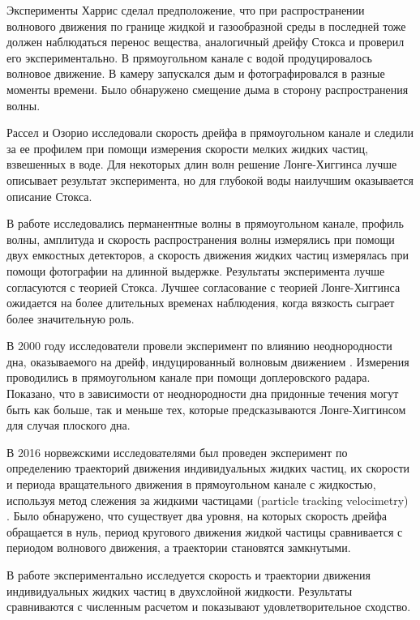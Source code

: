 Эксперименты
Харрис \cite{harris1966wave} сделал предположение, что при распространении волнового движения по границе жидкой и газообразной среды в последней тоже должен наблюдаться перенос вещества, аналогичный дрейфу Стокса и проверил его экспериментально. В прямоугольном канале с водой продуцировалось волновое движение. В камеру запускался дым и фотографировался в разные моменты времени. Было обнаружено смещение дыма в сторону распространения волны.

Рассел и Озорио \cite{russell1957experimental} исследовали скорость дрейфа в прямоугольном канале и следили за ее профилем при помощи измерения скорости мелких жидких частиц, взвешенных в воде. Для некоторых длин волн решение Лонге-Хиггинса лучше описывает результат эксперимента, но для глубокой воды наилучшим оказывается описание Стокса.

В работе \cite{tsuchiya1980mass} исследовались перманентные волны в прямоугольном канале, профиль волны, амплитуда и скорость распространения волны измерялись при помощи двух емкостных детекторов, а скорость движения жидких частиц измерялась при помощи фотографии на длинной выдержке. Результаты эксперимента лучше согласуются с теорией Стокса. Лучшее согласование с теорией Лонге-Хиггинса ожидается на более длительных временах наблюдения, когда вязкость сыграет более значительную роль.

В 2000 году исследователи провели эксперимент по влиянию неоднородности дна, оказываемого на дрейф, индуцированный волновым движением \cite{ridler2000effect}. Измерения проводились в прямоугольном канале при помощи доплеровского радара. Показано, что в зависимости от неоднородности дна придонные течения могут быть как больше, так и меньше тех, которые предсказываются Лонге-Хиггинсом для случая плоского дна.

В 2016 норвежскими исследователями был проведен эксперимент по определению траекторий движения индивидуальных жидких частиц, их скорости и периода вращательного движения в прямоугольном канале с жидкостью, используя метод слежения за жидкими частицами (particle tracking velocimetry) \cite{grue2017experimental}. Было обнаружено, что существует два уровня, на которых скорость дрейфа обращается в нуль, период кругового движения жидкой частицы сравнивается с периодом волнового движения, а траектории становятся замкнутыми.

В работе \cite{umeyama2011measurements} экспериментально исследуется скорость и траектории движения индивидуальных жидких частиц в двухслойной жидкости. Результаты сравниваются с численным расчетом и показывают удовлетворительное сходство.

